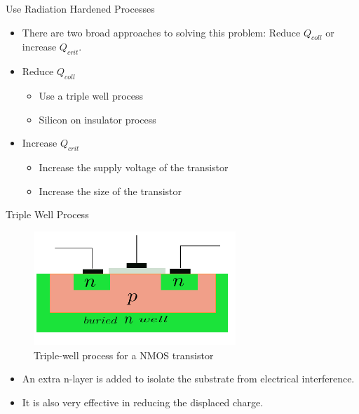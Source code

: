 \documentclass{beamer}
\begin{document}
\begin{frame}{Use Radiation Hardened Processes}
\begin{itemize}
 \item There are two broad approaches to solving this problem: Reduce $Q_{coll}$ or increase $Q_{crit}$.
 \item Reduce $Q_{coll}$
    \begin{itemize}
	\item Use a triple well process
	\item Silicon on insulator process
    \end{itemize}
  \item Increase $Q_{crit}$
    \begin{itemize}
	\item Increase the supply voltage of the transistor
	\item Increase the size of the transistor
    \end{itemize}
  
\end{itemize}
\end{frame}

\begin{frame}[shrink=10] {Triple Well Process}
\begin{center}
 \begin{figure}[h]
  \includegraphics[width=3in]{triple_well}
  \caption{\footnotesize Triple-well process for a NMOS transistor}
 \end{figure}
\end{center}
\begin{itemize}
 \item An extra n-layer is added to isolate the substrate from electrical interference.
  \item It is also very effective in reducing the displaced charge.
\end{itemize}

\end{frame}
\end{document}
